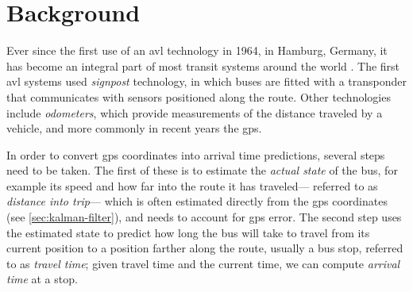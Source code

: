 \documentclass[12pt,a4paper]{article}
\begin{document}






\section{Background}
\label{sec:background}

Ever since the first use of an \gls{avl} technology in 1964, in Hamburg, Germany,
it has become an integral part of most transit systems around the world
\citep{tcrp:1997,tcrp:2003}.
The first \gls{avl} systems used \emph{signpost} technology,
in which buses are fitted with a transponder that communicates with
sensors positioned along the route.
Other technologies include \emph{odometers},
which provide measurements of the distance traveled by a vehicle,
and more commonly in recent years the \gls{gps}.


In order to convert \gls{gps} coordinates into arrival time predictions,
several steps need to be taken.
The first of these is to estimate the \emph{actual state} of the bus,
for example its speed and how far into the route it has traveled---%
referred to as \emph{distance into trip}---%
which is often estimated directly from the \gls{gps} coordinates
(see \cref{sec:kalman-filter}),
and needs to account for \gls{gps} error.
The second step uses the estimated state
to predict how long the bus will take to travel from its current position
to a position farther along the route, usually a bus stop,
referred to as \emph{travel time};
given travel time and the current time, 
we can compute \emph{arrival time} at a stop.
\end{document}
